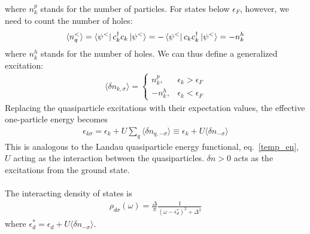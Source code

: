 \documentclass[twoside,11pt]{report}
\numberwithin{equation}{section}
\begin{document}
where \(n^p_k\) stands for the number of particles.
For states below \(\epsilon_F\), however, we need to count the number of holes:
\begin{equation}\begin{aligned}
	\langle  n_q^<\rangle = \bra{\psi^<}c^\dagger_k c_k\ket{\psi^<} = -\bra{\psi^<}c_k c^\dagger_k \ket{\psi^<} = -n^h_k
\end{aligned}\end{equation}
where \(n^h_k\) stands for the number of holes.
We can thus define a generalized excitation:
\begin{equation}\begin{aligned}
	\langle \delta n_{k,\sigma}\rangle = \begin{cases} n^p_k, &\epsilon_k > \epsilon_F\\ -n^h_k, &\epsilon_k < \epsilon_F\end{cases}
\end{aligned}\end{equation}
Replacing the quasiparticle excitations with their expectation values, the effective one-particle energy becomes
\begin{equation}\begin{aligned}
	\epsilon_{k\sigma} = \epsilon_k + U\sum_q \langle \delta n_{q,-\sigma}\rangle \equiv \epsilon_k + U\langle \delta n_{-\sigma}\rangle
\end{aligned}\end{equation}
This is analogous to the Landau quasiparticle energy functional, eq.~\ref{temp_en}, \(U\) acting as the interaction between the quasiparticles.
\(\delta n > 0\) acts as the excitations from the ground state.
\\\\
The interacting density of states is
\begin{equation}\begin{aligned}
	\label{dosint}
	\rho_{d\sigma}(\omega) = \frac{\Delta}{\pi}\frac{1}{\left(\omega - \epsilon_d^*\right)^2 + \Delta^2}
\end{aligned}\end{equation}
where \(\epsilon_d^* = \epsilon_d + U\langle \delta n_{-\sigma}\rangle\).
\end{document}
